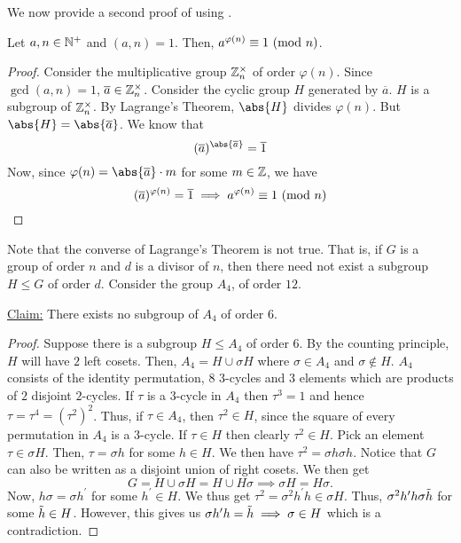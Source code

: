 We now provide a second proof of  using .

\begin{theorem} \label{thm:euler-group}
    Let $a,n \in \mathbb{N}^+$ and $(a,n) = 1$. Then, $a^{\varphi(n)} \equiv 1 \ (\mathrm{mod}\ n)$.
\end{theorem}
\begin{proof}
    Consider the multiplicative group $\mathbb{Z}_n^{\times}$ of order $\varphi(n)$. Since $\gcd(a,n) = 1$, $\overline{a} \in \mathbb{Z}_n^{\times}$. Consider the cyclic group $H$ generated by $\overline{a}$. $H$ is a subgroup of $\mathbb{Z}_n^{\times}$. By Lagrange's Theorem, $\abs{H}$ divides $\varphi(n)$. But $\abs{H} = \abs{\overline{a}}$. We know that 
    \[
        (\overline{a})^{\abs{\overline{a}}} = \overline{1}
    \]
    Now, since $\varphi(n) = \abs{\overline{a}} \cdot m$ for some $m \in \mathbb{Z}$, we have
    \[
        (\overline{a})^{\varphi(n)} = \overline{1} \implies a^{\varphi(n)} \equiv 1 \ (\mathrm{mod}\ n) \qedhere
    \]
\end{proof}

Note that the converse of Lagrange's Theorem is not true. That is, if $G$ is a group of order $n$ and $d$ is a divisor of $n$, then there need not exist a subgroup $H \leq G$ of order $d$. Consider the group $A_4$, of order $12$.

\underline{Claim:} There exists no subgroup of $A_4$ of order $6$.
\begin{proof}
    Suppose there is a subgroup $H \leq A_4$ of order $6$. By the counting principle, $H$ will have $2$ left cosets. Then, $A_4 = H \cup \sigma H$ where $\sigma \in A_4$ and $\sigma \notin H$. $A_4$ consists of the identity permutation, $8$ $3$-cycles and $3$ elements which are products of $2$ disjoint $2$-cycles. If $\tau$ is a $3$-cycle in $A_4$ then $\tau^3 = 1$ and hence $\tau = \tau^4 = (\tau^2)^2$. Thus, if $\tau \in A_4$, then $\tau^2 \in H$, since the square of every permutation in $A_4$ is a $3$-cycle. If $\tau \in H$ then clearly $\tau^2 \in H$. Pick an element $\tau \in \sigma H$. Then, $\tau = \sigma h$ for some $h \in H$. We then have $\tau^2 = \sigma h \sigma h $. Notice that $G$ can also be written as a disjoint union of right cosets. We then get
    \[
        G = H \cup \sigma H = H \cup H \sigma \implies \sigma H = H \sigma.
    \]
    Now, $h\sigma = \sigma h^{\prime}$ for some $h^{\prime} \in H$. We thus get $\tau^2 = \sigma^2 h^{\prime} h \in \sigma H$. Thus, $\sigma^2 h^{\prime} h \sigma \Tilde{h}$ for some $\Tilde{h} \in H$. However, this gives us $\sigma h^{\prime} h = \Tilde{h} \implies \sigma \in H$ which is a contradiction. 
\end{proof} 

